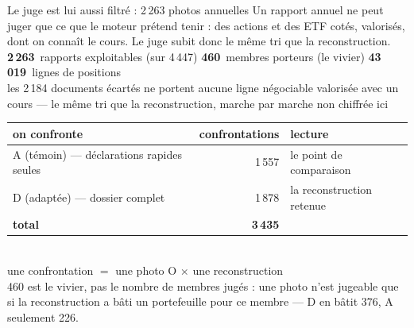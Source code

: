 \documentclass[11pt,aspectratio=169]{beamer}
\newcommand{\kpi}[3]{{\large\textbf{\textcolor{#1}{#2}}}~{\footnotesize #3}}
\newcommand{\defl}[1]{{\scriptsize\color{black!55}#1}}
\begin{document}
\begin{frame}{Le juge est lui aussi filtré : 2\,263 photos annuelles}
  \small
  Un rapport annuel ne peut juger que ce que le moteur prétend tenir : des actions et des ETF
  cotés, valorisés, dont on connaît le cours. Le juge subit donc le même tri que la reconstruction.\\[3mm]
  \centering
  \kpi{helec}{2\,263}{rapports exploitables (sur 4\,447)} \quad
  \kpi{helec}{460}{membres porteurs (le vivier)} \quad
  \kpi{helec}{43\,019}{lignes de positions}\\[2mm]
  \defl{les 2\,184 documents écartés ne portent aucune ligne négociable valorisée avec un cours ---
  le même tri que la reconstruction, marche par marche non chiffrée ici}\\[3mm]
  \begin{tabular}{lrl}
    \toprule
    on confronte & confrontations & lecture\\
    \midrule
    A (témoin) --- déclarations rapides seules & 1\,557 & le point de comparaison\\
    D (adaptée) --- dossier complet            & 1\,878 & la reconstruction retenue\\
    \midrule
    \textbf{total} & \textbf{3\,435} & \\
    \bottomrule
  \end{tabular}\\[1mm]
  \defl{une confrontation $=$ une photo O $\times$ une reconstruction}\\[2.5mm]
  \defl{460 est le vivier, pas le nombre de membres jugés : une photo n'est jugeable que si la
  reconstruction a bâti un portefeuille pour ce membre --- D en bâtit 376, A seulement 226.}
\end{frame}
\end{document}
